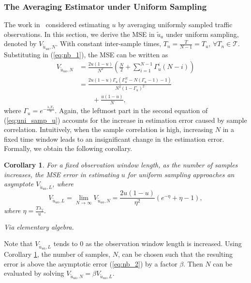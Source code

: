 \documentclass[11pt,draftclsnofoot,journal,onecolumn]{IEEEtran}
\newtheorem{corollary}{Corollary}
\begin{document}
\subsubsection{The Averaging Estimator under Uniform Sampling}
\label{sec:mse_u}

The work in~\cite{kim_tmc_2008,kim_dyspan_2008,liang_ita_2010,liang_tmc_2011} considered estimating $u$ by averaging uniformly sampled traffic observations. In this section, we derive the MSE in $\tilde{u}_a$ under uniform sampling, denoted by $V_{\tilde{u}_{ua},N}$. With constant inter-sample times, $T_n = \frac{T}{N-1} = T_u$, $\forall T_n \in \mathcal{T}$. Substituting in (\ref{eq;nb_1}), the MSE can be written as
\begin{align}
V_{\tilde{u}_{ua},N} &= \frac{2u(1-u)}{N^2}\left( \frac{N}{2} + \sum_{i=1}^{N-1} \Gamma_u^i(N-i)\right)\nonumber\\ & = \frac{2u(1-u)\Gamma_u(\Gamma_u^N-N(\Gamma_u-1)-1)}{N^2(1-\Gamma_u)^2}\nonumber\\&\qquad + \frac{u(1-u)}{N},
\label{eq;uni_samp_u}
\end{align}
where $\Gamma_u = e^{-\frac{\lambda_f T_u}{u}}$. Again, the leftmost part in the second equation of (\ref{eq;uni_samp_u}) accounts for the increase in estimation error caused by sample correlation. Intuitively, when the sample correlation is high, increasing $N$ in a fixed time window leads to an insignificant change in the estimation error. Formally, we obtain the following corollary.
\begin{corollary}
\label{th:v_ul}
For a fixed observation window length, as the number of samples increases, the MSE error in estimating $u$ for uniform sampling approaches an asymptote $V_{\tilde{u}_{ua},L}$, where
\begin{equation}
V_{\tilde{u}_{ua},L} = \lim_{N\to\infty} V_{\tilde{u}_{ua},N} = \frac{2u(1-u)}{\eta^2}\left(e^{-\eta}+\eta-1\right),
\label{eq:nb_2}
\end{equation}
where $\eta = \frac{T\lambda_f}{u}$.
\begin{IEEEproof}
Via elementary algebra.
\end{IEEEproof}
\end{corollary}

Note that $V_{\tilde{u}_{ua},L}$ tends to 0 as the observation window length is increased. Using Corollary \ref{th:v_ul}, the number of samples, $N$, can be chosen such that the resulting error is above the asymptotic error (\ref{eq:nb_2}) by a factor $\beta$. Then $N$ can be evaluated by solving $V_{\tilde{u}_{ua},N} = \beta V_{\tilde{u}_{ua},L}$.
\end{document}
